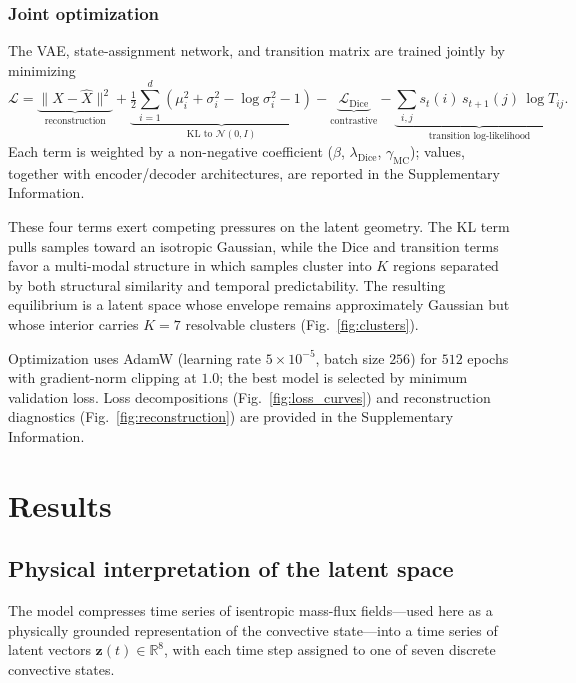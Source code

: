 \documentclass[11pt]{article}
\begin{document}
\subsubsection{Joint optimization}

The VAE, state-assignment network, and transition matrix are trained jointly by minimizing
\[
\mathcal{L} =
\underbrace{\|X - \hat{X}\|^2}_{\text{reconstruction}}
+
\underbrace{\tfrac{1}{2}\sum_{i=1}^d \left(\mu_i^2 + \sigma_i^2 - \log \sigma_i^2 - 1\right)}_{\text{KL to } \mathcal{N}(0,I)}
-
\underbrace{\mathcal{L}_{\mathrm{Dice}}}_{\text{contrastive}}
-
\underbrace{\sum_{i,j} s_t(i)\, s_{t+1}(j)\, \log T_{ij}}_{\text{transition log-likelihood}}.
\]
Each term is weighted by a non-negative coefficient ($\beta$, $\lambda_{\mathrm{Dice}}$, $\gamma_{\mathrm{MC}}$); values, together with encoder/decoder architectures, are reported in the Supplementary Information.

These four terms exert competing pressures on the latent geometry. The KL term pulls samples toward an isotropic Gaussian, while the Dice and transition terms favor a multi-modal structure in which samples cluster into $K$ regions separated by both structural similarity and temporal predictability. The resulting equilibrium is a latent space whose envelope remains approximately Gaussian but whose interior carries $K=7$ resolvable clusters (Fig.~\ref{fig:clusters}).

Optimization uses AdamW (learning rate $5\times10^{-5}$, batch size $256$) for $512$ epochs with gradient-norm clipping at $1.0$; the best model is selected by minimum validation loss. Loss decompositions (Fig.~\ref{fig:loss_curves}) and reconstruction diagnostics (Fig.~\ref{fig:reconstruction}) are provided in the Supplementary Information.



\section{Results}\label{sec:results}

\subsection{Physical interpretation of the latent space}

The model compresses time series of isentropic mass-flux fields---used here as a physically grounded representation of the convective state---into a time series of latent vectors $\mathbf{z}(t)\in\mathbb{R}^8$, with each time step assigned to one of seven discrete convective states.
\end{document}

